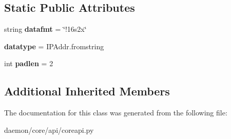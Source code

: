 \subsection*{Static Public Attributes}
\begin{DoxyCompactItemize}
\item 
\hypertarget{classcore_1_1api_1_1coreapi_1_1_core_tlv_data_i_pv6_addr_a69456e6e5b932a870942a4cbfa9be1c0}{string {\bfseries datafmt} = \char`\"{}!16s2x\char`\"{}}\label{classcore_1_1api_1_1coreapi_1_1_core_tlv_data_i_pv6_addr_a69456e6e5b932a870942a4cbfa9be1c0}

\item 
\hypertarget{classcore_1_1api_1_1coreapi_1_1_core_tlv_data_i_pv6_addr_a6f775f8a9251c92e881205d814f7e1e4}{{\bfseries datatype} = I\+P\+Addr.\+fromstring}\label{classcore_1_1api_1_1coreapi_1_1_core_tlv_data_i_pv6_addr_a6f775f8a9251c92e881205d814f7e1e4}

\item 
\hypertarget{classcore_1_1api_1_1coreapi_1_1_core_tlv_data_i_pv6_addr_af3237c09d4e8e3c2ee8ee1953f1a34a7}{int {\bfseries padlen} = 2}\label{classcore_1_1api_1_1coreapi_1_1_core_tlv_data_i_pv6_addr_af3237c09d4e8e3c2ee8ee1953f1a34a7}

\end{DoxyCompactItemize}
\subsection*{Additional Inherited Members}


The documentation for this class was generated from the following file\+:\begin{DoxyCompactItemize}
\item 
daemon/core/api/coreapi.\+py\end{DoxyCompactItemize}
